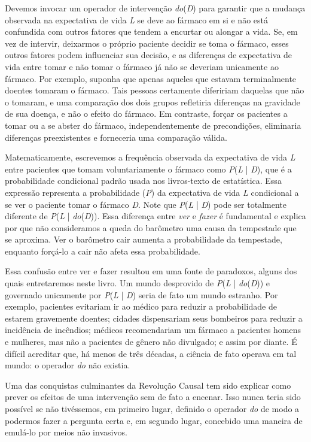 \documentclass[11pt,a5paper,twoside]{book}
\begin{document}
Devemos invocar um operador de intervenção \textit{do}(\textit{D}) para garantir que a mudança observada na expectativa de vida \textit{L} se deve ao fármaco em si e não está confundida com outros fatores que tendem a encurtar ou alongar a vida. Se, em vez de intervir, deixarmos o próprio paciente decidir se toma o fármaco, esses outros fatores podem influenciar sua decisão, e as diferenças de expectativa de vida entre tomar e não tomar o fármaco já não se deveriam unicamente ao fármaco. Por exemplo, suponha que apenas aqueles que estavam terminalmente doentes tomaram o fármaco. Tais pessoas certamente difeririam daquelas que não o tomaram, e uma comparação dos dois grupos refletiria diferenças na gravidade de sua doença, e não o efeito do fármaco. Em contraste, forçar os pacientes a tomar ou a se abster do fármaco, independentemente de precondições, eliminaria diferenças preexistentes e forneceria uma comparação válida.

Matematicamente, escrevemos a frequência observada da expectativa de vida \textit{L} entre pacientes que tomam voluntariamente o fármaco como \textit{P}(\textit{L} | \textit{D}), que é a probabilidade condicional padrão usada nos livros-texto de estatística. Essa expressão representa a probabilidade (\textit{P}) da expectativa de vida \textit{L} condicional a se ver o paciente tomar o fármaco \textit{D}. Note que \textit{P}(\textit{L} | \textit{D}) pode ser totalmente diferente de \textit{P}(\textit{L} | \textit{do}(\textit{D})). Essa diferença entre \textit{ver} e \textit{fazer} é fundamental e explica por que não consideramos a queda do barômetro uma causa da tempestade que se aproxima. Ver o barômetro cair aumenta a probabilidade da tempestade, enquanto forçá-lo a cair não afeta essa probabilidade.

Essa confusão entre ver e fazer resultou em uma fonte de paradoxos, alguns dos quais entretaremos neste livro. Um mundo desprovido de \textit{P}(\textit{L} | \textit{do}(\textit{D})) e governado unicamente por \textit{P}(\textit{L} | \textit{D}) seria de fato um mundo estranho. Por exemplo, pacientes evitariam ir ao médico para reduzir a probabilidade de estarem gravemente doentes; cidades dispensariam seus bombeiros para reduzir a incidência de incêndios; médicos recomendariam um fármaco a pacientes homens e mulheres, mas não a pacientes de gênero não divulgado; e assim por diante. É difícil acreditar que, há menos de três décadas, a ciência de fato operava em tal mundo: o operador \textit{do} não existia.

Uma das conquistas culminantes da Revolução Causal tem sido explicar como prever os efeitos de uma intervenção sem de fato a encenar. Isso nunca teria sido possível se não tivéssemos, em primeiro lugar, definido o operador \textit{do} de modo a podermos fazer a pergunta certa e, em segundo lugar, concebido uma maneira de emulá-lo por meios não invasivos.
\end{document}
